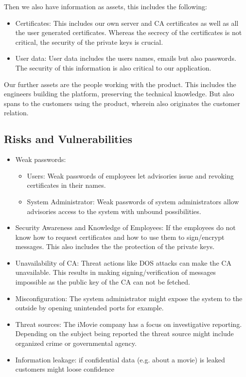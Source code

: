 \documentclass[english]{article}
\begin{document}
Then we also have information as assets, this includes the following:

\begin{itemize}
	\item Certificates: This includes our own server and CA certificates as well as all the user generated certificates. Whereas the secrecy of the certificates is not critical, the security of the private keys is crucial. 
	\item User data: User data includes the users names, emails but also passwords. The security of this information is also critical to our application.
\end{itemize}

Our further assets are the people working with the product. This includes the engineers building the platform, preserving the technical knowledge. But also spans to the customers using the product, wherein also originates the customer relation.   

\subsection{Risks and Vulnerabilities}

\begin{itemize}
    \item Weak passwords: 
    \begin{itemize}
        \item Users: Weak passwords of employees let advisories issue and revoking certificates in their names.
        \item System Administrator: Weak passwords of system administrators allow advisories access to the system with unbound possibilities.
    \end{itemize}
    \item Security Awareness and Knowledge of Employees: If the employees do not know how to request certificates and how to use them to sign/encrypt messages. This also includes the the protection of the private keys.
    \item Unavailability of CA: Threat actions like DOS attacks can make the CA unavailable. This results in making signing/verification of messages impossible as the public key of the CA can not be fetched. 
    \item Misconfiguration: The system administrator might expose the system to the outside by opening unintended ports for example.
    \item Threat sources: The iMovie company has a focus on investigative reporting. Depending on the subject being reported the threat source might include organized crime or governmental agency. 
    \item Information leakage: if confidential data (e.g. about a movie) is leaked customers might loose confidence
    \script 
\end{itemize}
\end{document}
